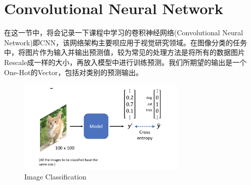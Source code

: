 \documentclass{article}
\begin{document}
\section{Convolutional Neural Network}
\indent 在这一节中，将会记录一下课程中学习的卷积神经网络(Convolutional Neural Network)即CNN，该网络架构主要呗应用于视觉研究领域。在图像分类的任务中，将图片作为输入并输出预测值，较为常见的处理方法是将所有的数据图片Rescale成一样的大小，再放入模型中进行训练预测。我们所期望的输出是一个One-Hot的Vector，包括对类别的预测输出。
\begin{figure}[H]
    \centering
    \includegraphics[width=8cm]{picture/ImageClassify.png}
    \caption{Image Classification}
    \label{fig:galxy}
\end{figure}
\end{document}
